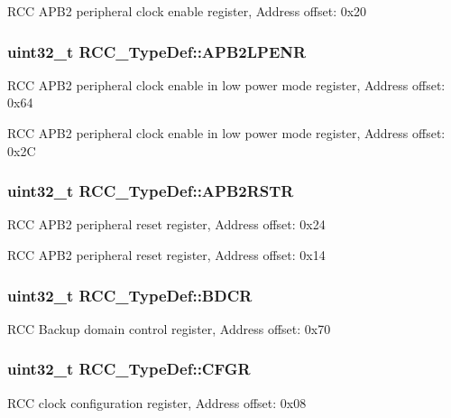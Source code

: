 R\-C\-C A\-P\-B2 peripheral clock enable register, Address offset\-: 0x20 \hypertarget{struct_r_c_c___type_def_a7e46c65220f00a6858a5b35b74a37b51}{
\subsubsection[{A\-P\-B2\-L\-P\-E\-N\-R}]{ uint32\-\_\-t R\-C\-C\-\_\-\-Type\-Def\-::\-A\-P\-B2\-L\-P\-E\-N\-R}}\label{struct_r_c_c___type_def_a7e46c65220f00a6858a5b35b74a37b51}
R\-C\-C A\-P\-B2 peripheral clock enable in low power mode register, Address offset\-: 0x64

R\-C\-C A\-P\-B2 peripheral clock enable in low power mode register, Address offset\-: 0x2\-C \hypertarget{struct_r_c_c___type_def_a4491ab20a44b70bf7abd247791676a59}{
\subsubsection[{A\-P\-B2\-R\-S\-T\-R}]{ uint32\-\_\-t R\-C\-C\-\_\-\-Type\-Def\-::\-A\-P\-B2\-R\-S\-T\-R}}\label{struct_r_c_c___type_def_a4491ab20a44b70bf7abd247791676a59}
R\-C\-C A\-P\-B2 peripheral reset register, Address offset\-: 0x24

R\-C\-C A\-P\-B2 peripheral reset register, Address offset\-: 0x14 \hypertarget{struct_r_c_c___type_def_a05be375db50e8c9dd24fb3bcf42d7cf1}{
\subsubsection[{B\-D\-C\-R}]{ uint32\-\_\-t R\-C\-C\-\_\-\-Type\-Def\-::\-B\-D\-C\-R}}\label{struct_r_c_c___type_def_a05be375db50e8c9dd24fb3bcf42d7cf1}
R\-C\-C Backup domain control register, Address offset\-: 0x70 \hypertarget{struct_r_c_c___type_def_a0721b1b729c313211126709559fad371}{
\subsubsection[{C\-F\-G\-R}]{ uint32\-\_\-t R\-C\-C\-\_\-\-Type\-Def\-::\-C\-F\-G\-R}}\label{struct_r_c_c___type_def_a0721b1b729c313211126709559fad371}
R\-C\-C clock configuration register, Address offset\-: 0x08

